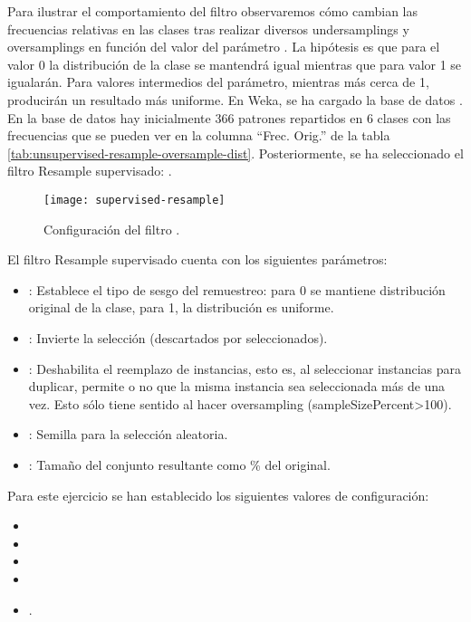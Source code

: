 Para ilustrar el comportamiento del filtro observaremos cómo cambian las frecuencias relativas en las clases tras realizar diversos undersamplings y oversamplings en función del valor del parámetro . La hipótesis es que para el valor 0 la distribución de la clase se mantendrá igual mientras que para valor 1 se igualarán. Para valores intermedios del parámetro, mientras más cerca de 1, producirán un resultado más uniforme. En Weka, se ha cargado la base de datos . En la base de datos hay inicialmente 366 patrones repartidos en 6 clases con las frecuencias que se pueden ver en la columna ``Frec. Orig.'' de la tabla \ref{tab:unsupervised-resample-oversample-dist}. Posteriormente, se ha seleccionado el filtro Resample supervisado: .

\begin{figure}[ht]
    \centering
    \texttt{[image: supervised-resample]}
    \caption{Configuración del filtro .}
    \label{fig:supervised-resample}
\end{figure}
El filtro Resample supervisado cuenta con los siguientes parámetros:

\begin{itemize}
    \item {}: Establece el tipo de sesgo del remuestreo: para 0 se mantiene distribución original de la clase, para 1, la distribución es uniforme.
    \item {}: Invierte la selección (descartados por seleccionados).
    \item {}: Deshabilita el reemplazo de instancias, esto es, al seleccionar instancias para duplicar, permite o no que la misma instancia sea seleccionada más de una vez. Esto sólo tiene sentido al hacer oversampling (sampleSizePercent>100).
    \item {}: Semilla para la selección aleatoria.
    \item {}: Tamaño del conjunto resultante como \% del original.
\end{itemize}

Para este ejercicio se han establecido los siguientes valores de configuración:
\begin {itemize}
    \item {}
    \item {}
    \item {}
    \item {}
    \item {}.
\end{itemize}

